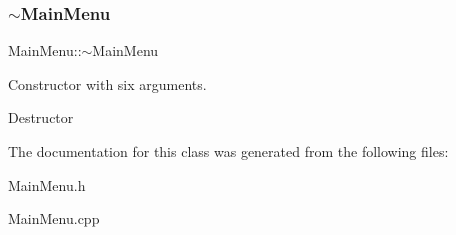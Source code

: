 \subsubsection{\texorpdfstring{$\sim$\+Main\+Menu}{~MainMenu}}
{\footnotesize\ttfamily Main\+Menu\+::$\sim$\+Main\+Menu}



Constructor with six arguments. 

Destructor 

The documentation for this class was generated from the following files\+:\begin{DoxyCompactItemize}
\item 
Main\+Menu.\+h\item 
Main\+Menu.\+cpp\end{DoxyCompactItemize}
